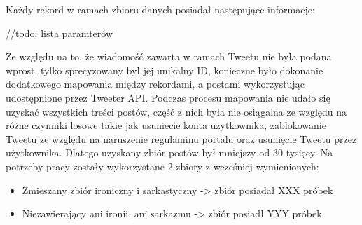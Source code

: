 Każdy rekord w ramach zbioru danych posiadał następujące informacje:

//todo: lista paramterów

Ze względu na to, że wiadomość zawarta w ramach Tweetu nie była podana wprost, tylko sprecyzowany był jej unikalny ID, konieczne było dokonanie dodatkowego mapowania między rekordami, a postami wykorzystując udostępnione przez Tweeter API. Podczas procesu mapowania nie udało się uzyskać wszystkich treści postów, część z nich była nie osiągalna ze względu na różne czynniki losowe takie jak usuniecie konta użytkownika, zablokowanie Tweetu ze względu na naruszenie regulaminu portalu oraz usunięcie Tweetu przez użytkownika. Dlatego uzyskany zbiór postów był mniejszy od 30 tysięcy.  
Na potrzeby pracy zostały wykorzystane 2 zbiory z wcześniej wymienionych:
\begin{itemize}
    \item Zmieszany zbiór ironiczny i sarkastyczny -> zbiór posiadał XXX próbek
    \item Niezawierający ani ironii, ani sarkazmu -> zbiór posiadł YYY próbek
\end{itemize}


